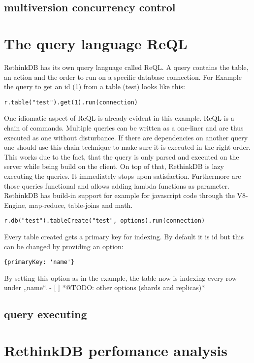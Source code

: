 \subsection{multiversion concurrency control}

\section{The query language ReQL}

RethinkDB has its own query language called ReQL. A query contains the table, an action and the order to run on a specific database connection. For Example the query to get an id (1) from a table (test) looks like this:

\begin{lstlisting}[frame=single, caption=get document from Database  (javascript driver), label=rget]
r.table("test").get(1).run(connection)
\end{lstlisting}

One idiomatic aspect of ReQL is already evident in this example. ReQL is a chain of commands. Multiple queries can be written as a one-liner and are thus executed as one without disturbance. If there are dependencies on another query one should use this chain-technique to make sure it is executed in the right order. This works due to the fact, that the query is only parsed and executed on the server while being build on the client. On top of that, RethinkDB is lazy executing the queries.  It immediately stops upon satisfaction. 
Furthermore are those queries functional and allows adding lambda functions as parameter. RethinkDB has build-in support for example for javascript code through the V8-Engine, map-reduce, table-joins and math.

\begin{lstlisting}[frame=single, caption=create the table 'test', label=createTable]
r.db("test").tableCreate("test", options).run(connection)
\end{lstlisting}

Every table created gets a primary key for indexing. By default it is id but this can be changed by providing an option:
\begin{lstlisting}[frame=single, caption=options for create table, label=cTableOptions]
{primaryKey: 'name'}
\end{lstlisting}

By setting this option as in the example, the table now is indexing every row under „name“.
- [ ] *@TODO: other options (shards and replicas)*

\subsection{query executing}



\section{RethinkDB perfomance analysis}
